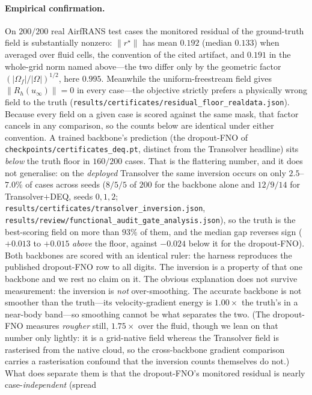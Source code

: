 \paragraph{Empirical confirmation.} On $200/200$ real AirfRANS test cases the monitored
residual of the ground-truth field is substantially nonzero: $\|r^\star\|$ has mean $0.192$
(median $0.133$) when averaged over fluid cells, the convention of the cited artifact, and
$0.191$ in the whole-grid norm named above---the two differ only by the geometric factor
$(|\Omega_f|/|\Omega|)^{1/2}$, here $0.995$. Meanwhile the uniform-freestream field
gives $\|R_h(u_\infty)\|=0$ in every case---the objective strictly prefers a physically
wrong field to the truth (\texttt{results/certificates/residual\_floor\_realdata.json}).
Because every field on a given case is scored against the same mask, that factor cancels in
any comparison, so the counts below are identical under either convention. A
trained backbone's prediction (the dropout-FNO of
\texttt{checkpoints/certificates\_deq.pt}, distinct from the Transolver headline) sits
\emph{below} the truth floor in $160/200$ cases. That is the flattering number, and it does
not generalise: on the
\emph{deployed} Transolver the same inversion occurs on only $2.5$--$7.0\%$ of cases
across seeds ($8/5/5$ of $200$ for the backbone alone and $12/9/14$ for
Transolver$+$DEQ, seeds $0,1,2$;
\texttt{results/certificates/transolver\_inversion.json},
\texttt{results/review/functional\_audit\_gate\_analysis.json}), so the
truth is the best-scoring field on more than $93\%$ of them, and the median gap reverses
sign ($+0.013$ to $+0.015$ \emph{above} the floor, against $-0.024$ below it for the
dropout-FNO). Both backbones are scored with an identical ruler: the harness reproduces
the published dropout-FNO row to all digits. The inversion is a property of that one
backbone and we rest no claim on it. The obvious explanation does not survive
measurement: the inversion is \emph{not} over-smoothing. The
accurate backbone is not smoother than the truth---its velocity-gradient energy is
$1.00\times$ the truth's in a near-body band---so smoothing cannot be what separates the
two. (The dropout-FNO measures \emph{rougher} still, $1.75\times$ over the fluid, though we
lean on that number only lightly: it is a grid-native field whereas the Transolver field is
rasterised from the native cloud, so the cross-backbone gradient comparison carries a
rasterisation confound that the inversion counts themselves do not.) What does separate
them is that the dropout-FNO's monitored residual is nearly case-\emph{independent} (spread
